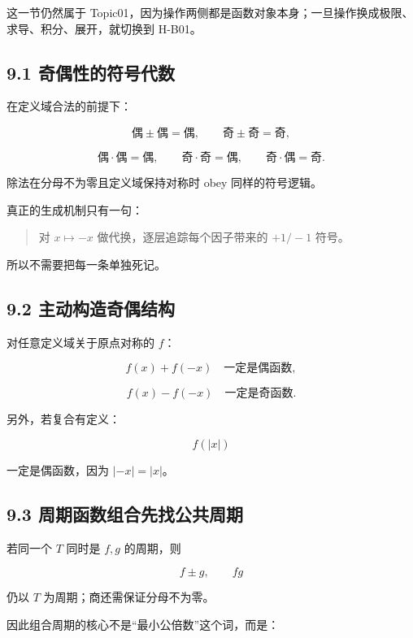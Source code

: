 \documentclass[11pt,a4paper]{ctexart}
\begin{document}
这一节仍然属于
Topic01，因为操作两侧都是函数对象本身；一旦操作换成极限、求导、积分、展开，就切换到
H-B01。

\subsection{9.1
奇偶性的符号代数}\label{ux5947ux5076ux6027ux7684ux7b26ux53f7ux4ee3ux6570}

在定义域合法的前提下：

\[
\text{偶}\pm\text{偶}=\text{偶},\qquad
\text{奇}\pm\text{奇}=\text{奇},
\]

\[
\text{偶}\cdot\text{偶}=\text{偶},\qquad
\text{奇}\cdot\text{奇}=\text{偶},\qquad
\text{奇}\cdot\text{偶}=\text{奇}.
\]

除法在分母不为零且定义域保持对称时 obey 同样的符号逻辑。

真正的生成机制只有一句：

\begin{quote}
对 \(x\mapsto -x\) 做代换，逐层追踪每个因子带来的 \(+1/-1\) 符号。
\end{quote}

所以不需要把每一条单独死记。

\subsection{9.2
主动构造奇偶结构}\label{ux4e3bux52a8ux6784ux9020ux5947ux5076ux7ed3ux6784}

对任意定义域关于原点对称的 \(f\)：

\[
f(x)+f(-x)\quad\text{一定是偶函数},
\]

\[
f(x)-f(-x)\quad\text{一定是奇函数}.
\]

另外，若复合有定义：

\[
f(|x|)
\]

一定是偶函数，因为 \(|-x|=|x|\)。

\subsection{9.3
周期函数组合先找公共周期}\label{ux5468ux671fux51fdux6570ux7ec4ux5408ux5148ux627eux516cux5171ux5468ux671f}

若同一个 \(T\) 同时是 \(f,g\) 的周期，则

\[
f\pm g,\qquad fg
\]

仍以 \(T\) 为周期；商还需保证分母不为零。

因此组合周期的核心不是``最小公倍数''这个词，而是：
\end{document}
